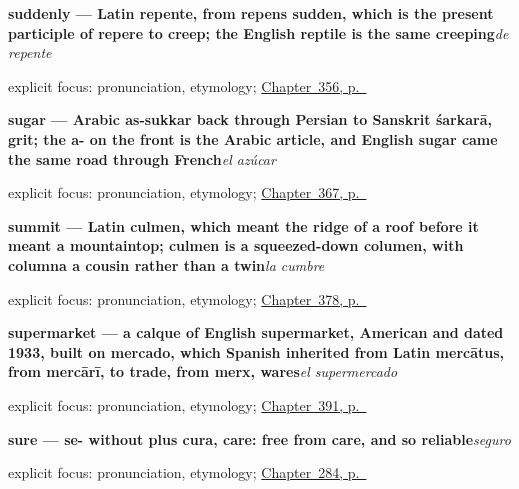 \noindent\begin{minipage}[t]{\linewidth}
\raggedright
\textbf{suddenly — Latin repente, from repens sudden, which is the present participle of repere to creep; the English reptile is the same creeping}\enspace\emph{de repente}\par
\footnotesize explicit focus: pronunciation, etymology; \hyperref[ch:desde-y-de-repente]{Chapter~356, p.~\pageref*{ch:desde-y-de-repente}}
\end{minipage}\par\smallskip

\noindent\begin{minipage}[t]{\linewidth}
\raggedright
\textbf{sugar — Arabic as-sukkar back through Persian to Sanskrit śarkarā, grit; the a- on the front is the Arabic article, and English sugar came the same road through French}\enspace\emph{el azúcar}\par
\footnotesize explicit focus: pronunciation, etymology; \hyperref[ch:el-desayuno-y-la-fruta]{Chapter~367, p.~\pageref*{ch:el-desayuno-y-la-fruta}}
\end{minipage}\par\smallskip

\noindent\begin{minipage}[t]{\linewidth}
\raggedright
\textbf{summit — Latin culmen, which meant the ridge of a roof before it meant a mountaintop; culmen is a squeezed-down columen, with columna a cousin rather than a twin}\enspace\emph{la cumbre}\par
\footnotesize explicit focus: pronunciation, etymology; \hyperref[ch:la-selva-y-el-prado]{Chapter~378, p.~\pageref*{ch:la-selva-y-el-prado}}
\end{minipage}\par\smallskip

\noindent\begin{minipage}[t]{\linewidth}
\raggedright
\textbf{supermarket — a calque of English supermarket, American and dated 1933, built on mercado, which Spanish inherited from Latin mercātus, from mercārī, to trade, from merx, wares}\enspace\emph{el supermercado}\par
\footnotesize explicit focus: pronunciation, etymology; \hyperref[ch:el-menu-y-el-camarero]{Chapter~391, p.~\pageref*{ch:el-menu-y-el-camarero}}
\end{minipage}\par\smallskip

\noindent\begin{minipage}[t]{\linewidth}
\raggedright
\textbf{sure — se- without plus cura, care: free from care, and so reliable}\enspace\emph{seguro}\par
\footnotesize explicit focus: pronunciation, etymology; \hyperref[ch:respuestas-cortas]{Chapter~284, p.~\pageref*{ch:respuestas-cortas}}
\end{minipage}\par\smallskip

